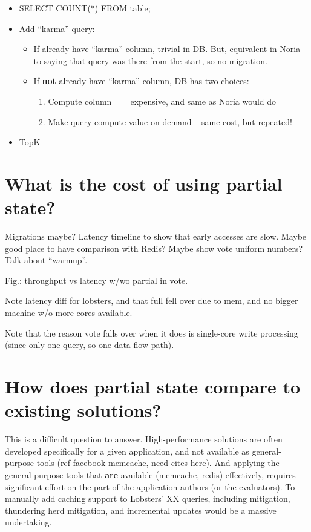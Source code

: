 \begin{itemize}
 \item SELECT COUNT(*) FROM table;
 \item Add ``karma'' query:
   \begin{itemize}
    \item If already have ``karma'' column, trivial in DB. But, equivalent in
      Noria to saying that query was there from the start, so no migration.
    \item If \textbf{not} already have ``karma'' column, DB has two choices:
     \begin{enumerate}
      \item Compute column == expensive, and same as Noria would do
      \item Make query compute value on-demand -- same cost, but repeated!
     \end{enumerate}
   \end{itemize}
 \item TopK
\end{itemize}

\section{What is the cost of using partial state?}
\label{s:eval:cost}

Migrations maybe? Latency timeline to show that early accesses are slow.
Maybe good place to have comparison with Redis? Maybe show vote uniform
numbers? Talk about ``warmup''.

Fig.: throughput vs latency w/wo partial in vote.

Note latency diff for lobsters, and that full fell over due to mem, and
no bigger machine w/o more cores available.

Note that the reason vote falls over when it does is single-core write
processing (since only one query, so one data-flow path).

\section{How does partial state compare to existing solutions?}
\label{s:eval:existing}

This is a difficult question to answer. High-performance solutions are
often developed specifically for a given application, and not available
as general-purpose tools (ref facebook memcache, need cites here).
And applying the general-purpose tools that \textbf{are} available (memcache,
redis) effectively, requires significant effort on the part of the
application authors (or the evaluators). To manually add caching support
to Lobsters' XX queries, including mitigation, thundering herd
mitigation, and incremental updates would be a massive undertaking.


